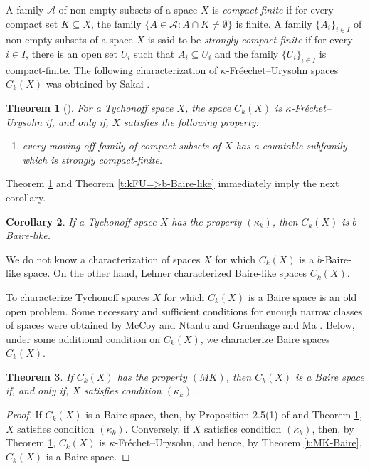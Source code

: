 \documentclass[preprint,11pt]{elsarticle}
\newtheorem{theorem}{Theorem}[section]
\newtheorem{corollary}[theorem]{Corollary}
\theoremstyle{definition}
\theoremstyle{remark}
\numberwithin{equation}{section}
\numberwithin{theorem}{section}
\newcommand{\AAA}{\mathcal{A}}
\newcommand{\CC}{C_k}
\begin{document}
A  family $\AAA$ of non-empty subsets of a space $X$ is {\em compact-finite} if for every compact set $K\subseteq X$, the family $\{A\in\AAA: A\cap K\not=\emptyset\}$ is finite. A  family $\{A_i\}_{i\in I}$ of non-empty subsets of a space $X$ is said to be {\em strongly compact-finite} if for every $i\in I$, there is an open set $U_i$ such that $A_i\subseteq U_i$ and the family $\{U_i\}_{i\in I}$ is compact-finite. The following characterization of $\kappa$-Fr\'{e}echet--Urysohn spaces $\CC(X)$ was obtained by Sakai \cite[Theorem~2.3]{Sakai}.

\begin{theorem}[\cite{Sakai}] \label{t:Ck-kFU}
For a Tychonoff space $X$, the space $\CC(X)$ is $\kappa$-Fr\'{e}chet--Urysohn if, and only if, $X$ satisfies the following property:
\begin{enumerate}
\item[$(\kappa_k)$] every moving off family of compact subsets of $X$ has a countable subfamily which is strongly compact-finite.
\end{enumerate}
\end{theorem}


Theorem \ref{t:Ck-kFU} and Theorem \ref{t:kFU=>b-Baire-like} immediately imply the next corollary.
\begin{corollary} \label{c:Ck-b-Baire-like}
If a Tychonoff space $X$ has the property $(\kappa_k)$, then $\CC(X)$ is $b$-Baire-like.
\end{corollary}
We do not know a characterization of spaces $X$ for which $\CC(X)$ is a $b$-Baire-like space. On the other hand, Lehner \cite[Proposition~2.18]{kak} characterized Baire-like spaces $\CC(X)$.

To characterize Tychonoff spaces $X$ for which $\CC(X)$ is a Baire space is an old open problem. Some necessary and sufficient conditions for enough narrow classes of spaces were obtained by McCoy and Ntantu \cite[Chapter~5.3]{mcoy} and Gruenhage and Ma \cite{GruenhageMa1997}.
Below, under some additional condition on $\CC(X)$, we characterize Baire spaces $\CC(X)$.
\begin{theorem}\label{t:Ck_MK}
If $\CC(X)$ has the property $(MK)$, then $\CC(X)$ is a Baire space if, and only if, $X$ satisfies condition $(\kappa_k)$.
\end{theorem}

\begin{proof}
If $\CC(X)$ is a Baire space, then, by Proposition 2.5(1) of \cite{Sakai} and Theorem \ref{t:Ck-kFU},  $X$ satisfies condition $(\kappa_k)$. Conversely, if  $X$ satisfies condition $(\kappa_k)$, then, by Theorem \ref{t:Ck-kFU}, $\CC(X)$ is $\kappa$-Fr\'{e}chet--Urysohn, and hence, by Theorem \ref{t:MK-Baire},  $\CC(X)$ is a Baire space.
\end{proof}
\end{document}
